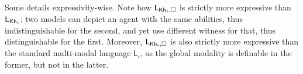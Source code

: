 Some details expressivity-wise. Note how $\mathsf{L}_{{\sf Kh}_i,\square}$ is strictly more expressive than $\mathsf{L}_{{\sf Kh}_i}$: two models can depict an agent with the same abilities, thus indistinguishable for the second, and yet use different witness for that, thus distinguishable for the first. Moreover, $\mathsf{L}_{{\sf Kh}_i,\square}$ is also strictly more expressive than the standard multi-modal language $\mathsf{L}_{\square}$, as the global modality is definable in the former, but not in the latter.

\medskip
